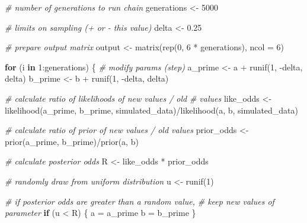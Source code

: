 \documentclass[
]{article}
\newenvironment{Shaded}{\begin{snugshade}}{\end{snugshade}}
\newcommand{\AttributeTok}[1]{\textcolor[rgb]{0.77,0.63,0.00}{#1}}
\newcommand{\CommentTok}[1]{\textcolor[rgb]{0.56,0.35,0.01}{\textit{#1}}}
\newcommand{\ControlFlowTok}[1]{\textcolor[rgb]{0.13,0.29,0.53}{\textbf{#1}}}
\newcommand{\DecValTok}[1]{\textcolor[rgb]{0.00,0.00,0.81}{#1}}
\newcommand{\FloatTok}[1]{\textcolor[rgb]{0.00,0.00,0.81}{#1}}
\newcommand{\FunctionTok}[1]{\textcolor[rgb]{0.00,0.00,0.00}{#1}}
\newcommand{\NormalTok}[1]{#1}
\newcommand{\OtherTok}[1]{\textcolor[rgb]{0.56,0.35,0.01}{#1}}
\newcommand{\SpecialCharTok}[1]{\textcolor[rgb]{0.00,0.00,0.00}{#1}}
\begin{document}
\begin{Shaded}
\begin{Highlighting}[]
\CommentTok{\# number of generations to run chain}
\NormalTok{generations }\OtherTok{\textless{}{-}} \DecValTok{5000}

\CommentTok{\# limits on sampling (+ or {-} this value)}
\NormalTok{delta }\OtherTok{\textless{}{-}} \FloatTok{0.25}

\CommentTok{\# prepare output matrix}
\NormalTok{output }\OtherTok{\textless{}{-}} \FunctionTok{matrix}\NormalTok{(}\FunctionTok{rep}\NormalTok{(}\DecValTok{0}\NormalTok{, }\DecValTok{6} \SpecialCharTok{*}\NormalTok{ generations), }\AttributeTok{ncol =} \DecValTok{6}\NormalTok{)}

\ControlFlowTok{for}\NormalTok{ (i }\ControlFlowTok{in} \DecValTok{1}\SpecialCharTok{:}\NormalTok{generations) \{}
    \CommentTok{\# modify params (step)}
\NormalTok{    a\_prime }\OtherTok{\textless{}{-}}\NormalTok{ a }\SpecialCharTok{+} \FunctionTok{runif}\NormalTok{(}\DecValTok{1}\NormalTok{, }\SpecialCharTok{{-}}\NormalTok{delta, delta)}
\NormalTok{    b\_prime }\OtherTok{\textless{}{-}}\NormalTok{ b }\SpecialCharTok{+} \FunctionTok{runif}\NormalTok{(}\DecValTok{1}\NormalTok{, }\SpecialCharTok{{-}}\NormalTok{delta, delta)}

    \CommentTok{\# calculate ratio of likelihoods of new values / old}
    \CommentTok{\# values}
\NormalTok{    like\_odds }\OtherTok{\textless{}{-}} \FunctionTok{likelihood}\NormalTok{(a\_prime, b\_prime, simulated\_data)}\SpecialCharTok{/}\FunctionTok{likelihood}\NormalTok{(a,}
\NormalTok{        b, simulated\_data)}

    \CommentTok{\# calculate ratio of prior of new values / old values}
\NormalTok{    prior\_odds }\OtherTok{\textless{}{-}} \FunctionTok{prior}\NormalTok{(a\_prime, b\_prime)}\SpecialCharTok{/}\FunctionTok{prior}\NormalTok{(a, b)}

    \CommentTok{\# calculate posterior odds}
\NormalTok{    R }\OtherTok{\textless{}{-}}\NormalTok{ like\_odds }\SpecialCharTok{*}\NormalTok{ prior\_odds}

    \CommentTok{\# randomly draw from uniform distribution}
\NormalTok{    u }\OtherTok{\textless{}{-}} \FunctionTok{runif}\NormalTok{(}\DecValTok{1}\NormalTok{)}

    \CommentTok{\# if posterior odds are greater than a random value,}
    \CommentTok{\# keep new values of parameter}
    \ControlFlowTok{if}\NormalTok{ (u }\SpecialCharTok{\textless{}}\NormalTok{ R) \{}
\NormalTok{        a }\OtherTok{=}\NormalTok{ a\_prime}
\NormalTok{        b }\OtherTok{=}\NormalTok{ b\_prime}
\NormalTok{    \}}


\end{Highlighting}
\end{Shaded}
\end{document}
